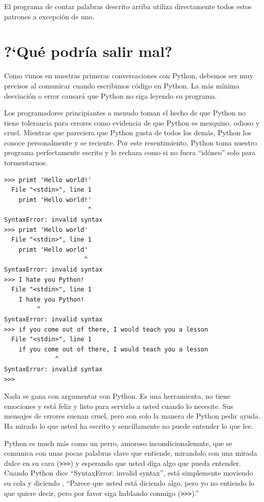 El programa de contar palabras descrito arriba utiliza directamente todos estos patrones a excepci\'on de uno.

\section{?`Qu\'e podr\'ia salir mal?}

Como vimos en nuestras primeras conversaciones con Python, debemos ser muy precisos al comunicar cuando escribimos c\'odigo en Python. La m\'as m\'inima desviaci\'on o error causar\'a que Python no siga leyendo su programa.

Los programadores principiantes a menudo toman el hecho de que Python no tiene tolerancia para errores como evidencia de que Python es mezquino, odioso y cruel.
Mientras que pareciera que Python gusta de todos los dem\'as, Python los conoce personalmente y se reciente. Por este resentimiento, Python toma nuestro programa perfectamente escrito y lo rechaza como si no fuera ``id\'oneo'' solo para tormentarnos.

\beforeverb
\begin{verbatim}
>>> primt 'Hello world!'
  File "<stdin>", line 1
    primt 'Hello world!'
                       ^
SyntaxError: invalid syntax
>>> primt 'Hello world'
  File "<stdin>", line 1
    primt 'Hello world'
                      ^
SyntaxError: invalid syntax
>>> I hate you Python!
  File "<stdin>", line 1
    I hate you Python!
         ^
SyntaxError: invalid syntax
>>> if you come out of there, I would teach you a lesson
  File "<stdin>", line 1
    if you come out of there, I would teach you a lesson
              ^
SyntaxError: invalid syntax
>>> 
\end{verbatim}
\afterverb
%
Nada se gana con argumentar con Python. Es una herramienta,
no tiene emociones y est\'a feliz y listo para servirlo a usted cuando lo necesite. Sus mensajes de errores suenan cruel, pero son solo la manera de Python pedir ayuda. Ha mirado lo que usted ha escrito y sencillamente no puede entender lo que lee.

Python es much m\'as como un perro, amoroso incondicionalemnte, que se comunica con unas pocas palabras clave que entiende, mir\;andolo con una mirada dulce en su cara ({\tt >>>}) y esperando que usted diga algo que pueda entender.
Cuando Python dice ``SyntaxError: invalid syntax'', est\'a simplemente moviendo su cola y diciendo , ``Parece que usted est\'a diciendo algo, pero yo no entiendo lo que quiere decir, pero por favor siga hablando conmigo ({\tt >>>}).''

